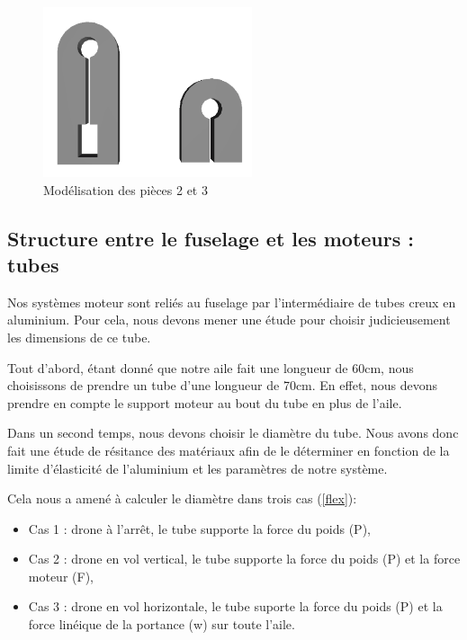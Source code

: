\documentclass[a4paper,12pt,french]{report}
\begin{document}
\begin{figure}[h]
    \centering
    \includegraphics[height=5cm]{figures/mot2.png}
    \caption{Modélisation des pièces 2 et 3}
\end{figure}

\subsection{Structure entre le fuselage et les moteurs : tubes}

Nos systèmes moteur sont reliés au fuselage par l'intermédiaire de tubes creux en aluminium. Pour cela, nous devons mener une étude pour choisir judicieusement les dimensions de ce tube.\newline

Tout d'abord, étant donné que notre aile fait une longueur de 60cm, nous choisissons de prendre un tube d'une longueur de 70cm. En effet, nous devons prendre en compte  le support moteur au bout du tube en plus de l'aile.\newline

Dans un second temps, nous devons choisir le diamètre du tube. Nous avons donc fait une étude de résitance des matériaux afin de le déterminer en fonction de la limite d'élasticité de l'aluminium et les paramètres de notre système.\newline

Cela nous a amené à calculer le diamètre dans trois cas (\ref{flex}):
\begin{itemize}
    \item Cas 1 : drone à l'arrêt, le tube supporte la force du poids (P),
    \item Cas 2 : drone en vol vertical, le tube supporte la force du poids (P) et la force moteur (F),
    \item Cas 3 : drone en vol horizontale, le tube suporte la force du poids (P) et la force linéique de la portance (w) sur toute l'aile.
\end{itemize}
\end{document}
